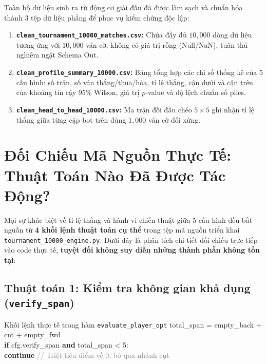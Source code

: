 \documentclass[11pt,a4paper]{article}
\begin{document}
Toàn bộ dữ liệu sinh ra từ động cơ giải đấu đã được làm sạch và chuẩn hóa thành 3 tệp dữ liệu phẳng để phục vụ kiểm chứng độc lập:
\begin{enumerate}
    \item \textbf{\texttt{clean\_tournament\_10000\_matches.csv}:} Chứa đầy đủ $10{,}000$ dòng dữ liệu tương ứng với $10{,}000$ ván cờ, không có giá trị rỗng (Null/NaN), tuân thủ nghiêm ngặt Schema Out.
    \item \textbf{\texttt{clean\_profile\_summary\_10000.csv}:} Bảng tổng hợp các chỉ số thống kê của 5 cấu hình: số trận, số ván thắng/thua/hòa, tỉ lệ thắng, cận dưới và cận trên của khoảng tin cậy 95\% Wilson, giá trị $p$-value và độ lệch chuẩn số plies.
    \item \textbf{\texttt{clean\_head\_to\_head\_10000.csv}:} Ma trận đối đầu chéo $5 \times 5$ ghi nhận tỉ lệ thắng giữa từng cặp bot trên đúng $1{,}000$ ván cờ đối xứng.
\end{enumerate}


\FloatBarrier
\section{Đối Chiếu Mã Nguồn Thực Tế: Thuật Toán Nào Đã Được Tác Động?}

Mọi sự khác biệt về tỉ lệ thắng và hành vi chiến thuật giữa 5 cấu hình đều bắt nguồn từ \textbf{4 khối lệnh thuật toán cụ thể} trong tệp mã nguồn triển khai \texttt{tournament\_10000\_engine.py}. Dưới đây là phân tích chi tiết đối chiếu trực tiếp vào code thực tế, \textbf{tuyệt đối không suy diễn những thành phần không tồn tại}:

\subsection{Thuật toán 1: Kiểm tra không gian khả dụng (\texttt{verify\_span})}
\begin{codebox}{Khối lệnh thực tế trong hàm \texttt{evaluate\_player\_opt}}
\small\ttfamily
total\_span = empty\_back + cnt + empty\_fwd\\
\textbf{if} cfg.verify\_span \textbf{and} total\_span < 5:\\
\quad \textbf{continue} \hfill\textcolor{gray}{// Triệt tiêu điểm về 0, bỏ qua nhánh cụt}
\end{codebox}
\end{document}
